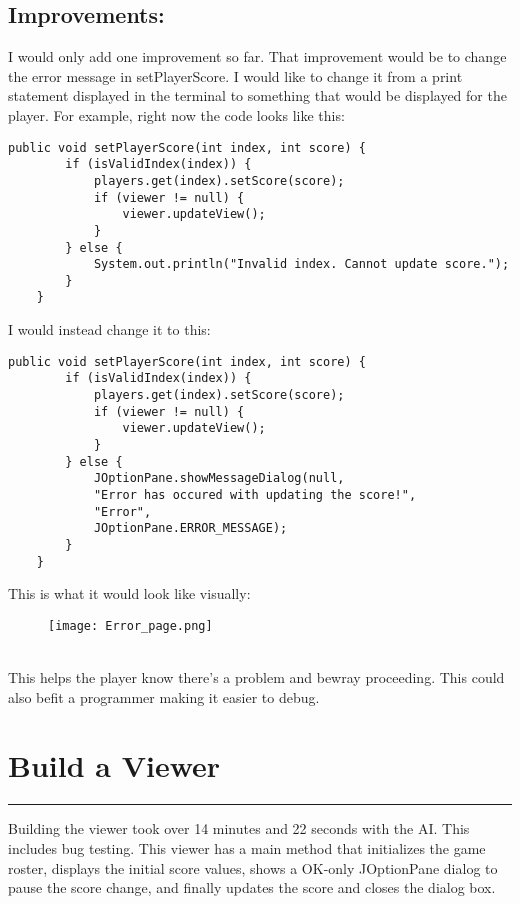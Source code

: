 \documentclass[a4paper,11pt]{article}
\begin{document}
\subsection*{Improvements:}
I would only add one improvement so far. That improvement would be to change the error message in setPlayerScore. I would like to change it from a print statement displayed in the terminal to something that would be displayed for the player. For example, right now the code looks like this:
\begin{lstlisting}
public void setPlayerScore(int index, int score) {
        if (isValidIndex(index)) {
            players.get(index).setScore(score);
            if (viewer != null) {
                viewer.updateView();
            }
        } else {
            System.out.println("Invalid index. Cannot update score.");
        }
    }
\end{lstlisting}
I would instead change it to this:
\begin{lstlisting}
public void setPlayerScore(int index, int score) {
        if (isValidIndex(index)) {
            players.get(index).setScore(score);
            if (viewer != null) {
                viewer.updateView();
            }
        } else {
            JOptionPane.showMessageDialog(null, 
            "Error has occured with updating the score!", 
            "Error", 
            JOptionPane.ERROR_MESSAGE);
        }
    }
\end{lstlisting}
This is what it would look like visually:
\begin{figure}[h] 
    \centering
    \texttt{[image: Error\_page.png]}
    \label{fig:first}
\end{figure}\\
This helps the player know there’s a problem and bewray proceeding. This could also befit a programmer making it easier to debug. 

\section*{Build a Viewer}
\hrule
\vspace{10pt} %
Building the viewer took over 14 minutes and 22 seconds with the AI. This includes bug testing. This viewer has a main method that initializes the game roster, displays the initial score values, shows a OK-only JOptionPane dialog to pause the score change, and finally updates the score and closes the dialog box.  

\vspace{5pt} %
\end{document}
